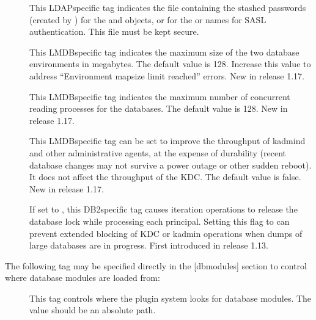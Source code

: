 \documentclass[letterpaper,10pt,english]{sphinxmanual}
\begin{document}
\begin{description}
\item[{}] \leavevmode
\sphinxAtStartPar
This LDAP\sphinxhyphen{}specific tag indicates the file containing the stashed
passwords (created by ) for the
 and  objects, or for the
 or  names
for SASL authentication.  This file must be kept secure.

\item[{}] \leavevmode
\sphinxAtStartPar
This LMDB\sphinxhyphen{}specific tag indicates the maximum size of the two
database environments in megabytes.  The default value is 128.
Increase this value to address “Environment mapsize limit reached”
errors.  New in release 1.17.

\item[{}] \leavevmode
\sphinxAtStartPar
This LMDB\sphinxhyphen{}specific tag indicates the maximum number of concurrent
reading processes for the databases.  The default value is 128.
New in release 1.17.

\item[{}] \leavevmode
\sphinxAtStartPar
This LMDB\sphinxhyphen{}specific tag can be set to improve the throughput of
kadmind and other administrative agents, at the expense of
durability (recent database changes may not survive a power outage
or other sudden reboot).  It does not affect the throughput of the
KDC.  The default value is false.  New in release 1.17.

\item[{}] \leavevmode
\sphinxAtStartPar
If set to , this DB2\sphinxhyphen{}specific tag causes iteration
operations to release the database lock while processing each
principal.  Setting this flag to  can prevent extended
blocking of KDC or kadmin operations when dumps of large databases
are in progress.  First introduced in release 1.13.

\end{description}

\sphinxAtStartPar
The following tag may be specified directly in the {[}dbmodules{]}
section to control where database modules are loaded from:
\begin{description}
\item[{}] \leavevmode
\sphinxAtStartPar
This tag controls where the plugin system looks for database
modules.  The value should be an absolute path.

\end{description}
\end{document}

